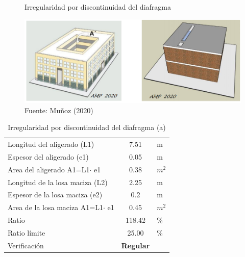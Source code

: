 \documentclass{article}%
\begin{document}
\begin{figure}[ht!]%
\centering%
\caption{Irregularidad por discontinuidad del diafragma}%
\includegraphics[scale=0.7]{images/i_diafragma.PNG}%
\caption*{\small Fuente: Muñoz (2020)}%
\end{figure}

%


\begin{table}[H]%
\centering%
\caption{Irregularidad por discontinuidad del diafragma (a)}%
\begin{tabular}{|ll|c|r}%
\cline{1-3}%
\multicolumn{2}{|l|}{Longitud del aligerado (L1)} & 7.51 & \multicolumn{1}{l}{m} \\%
\cline{1-3}%
\multicolumn{2}{|l|}{Espesor del aligerado (e1)} & 0.05 & \multicolumn{1}{l}{m} \\%
\cline{1-3}%
\multicolumn{2}{|l|}{Area del aligerado A1=L1$\cdot$ e1} & 0.38 & \multicolumn{1}{l}{$m^2$} \\%
\cline{1-3}%
\multicolumn{2}{|l|}{Longitud de la losa maciza (L2)} & 2.25 & \multicolumn{1}{l}{m} \\%
\cline{1-3}%
\multicolumn{2}{|l|}{Espesor de la losa maciza (e2)} & 0.2 & \multicolumn{1}{l}{m} \\%
\cline{1-3}%
\multicolumn{2}{|l|}{Area de la losa maciza A1=L1$\cdot$ e1} & 0.45 & \multicolumn{1}{l}{$m^2$} \\%
\cline{1-3}%
\multicolumn{2}{|l|}{Ratio} & 118.42 & \multicolumn{1}{l}{\%} \\%
\cline{1-3}%
\multicolumn{2}{|l|}{Ratio límite} & 25.00 & \multicolumn{1}{l}{\%} \\%
\cline{1-3}%
\multicolumn{2}{|l|}{Verificación} & \textcolor[rgb]{ .267,  .447,  .769}{\textbf{Regular}} & \multicolumn{1}{l}{} \\%
\cline{1-3}%
\end{tabular}%
\end{table}

%
\end{document}
